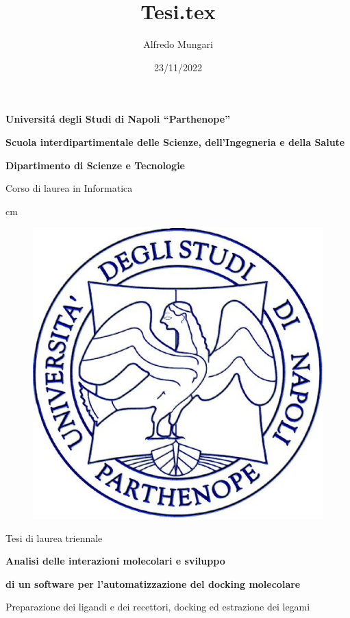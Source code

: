 \documentclass[12pt,italian,a4paper,oneside,openright]{book}
\title{Tesi.tex}
\author{Alfredo Mungari}
\date{23/11/2022}
\begin{document}
\baselineskip 1.5cm 

\thispagestyle{empty}

\vskip 1cm 

    \large \centerline{\bf Universit\'a degli Studi di Napoli ``Parthenope''}
    \centerline{\bf Scuola interdipartimentale delle Scienze, dell'Ingegneria e della Salute}
    \centerline{\bf Dipartimento di Scienze e Tecnologie}

    \centerline{\small Corso di laurea in Informatica}

     cm

    \begin{figure}[H]
    \centering
        \includegraphics[scale=0.30]{immagini/logoParthenope.png}
        \label{fig:logoParthenope}
    \end{figure}

    \vskip 0.5cm

    \large \centerline {Tesi di laurea triennale}

    \vskip 0.5cm

    \Large \centerline {\bf Analisi delle interazioni molecolari e sviluppo }
    \Large \centerline {\bf di un software per l'automatizzazione del docking molecolare}

    \centerline {\small Preparazione dei ligandi e dei recettori, docking ed estrazione dei legami}
\end{document}
